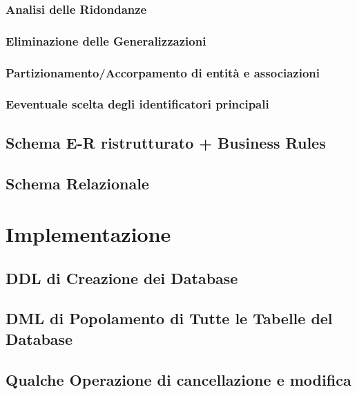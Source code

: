 \documentclass[12pt, letterpaper]{report}
\begin{document}
\subsection{Analisi delle Ridondanze}
\subsection{Eliminazione delle Generalizzazioni}
\subsection{Partizionamento/Accorpamento di entità e associazioni}
\subsection{Eeventuale scelta degli identificatori principali}
\section{Schema E-R ristrutturato + Business Rules}
\section{Schema Relazionale}

\chapter{Implementazione}
\section{DDL di Creazione dei Database}
\section{DML di Popolamento di Tutte le Tabelle del Database}
\section{Qualche Operazione di cancellazione e modifica}
\end{document}

